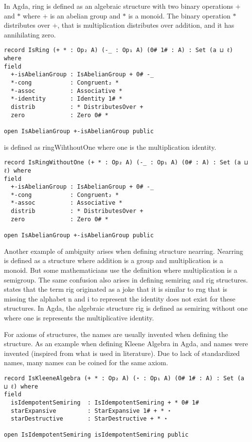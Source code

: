 In Agda, ring is defined as an algebraic structure with two binary operations $+$
and $*$ where $+$ is an abelian group and $*$ is a monoid. The binary operation $*$
distributes over $+$, that is multiplication distributes over addition, and it has
annihilating zero.

\begin{verbatim}
record IsRing (+ * : Op₂ A) (-_ : Op₁ A) (0# 1# : A) : Set (a ⊔ ℓ) where
field
  +-isAbelianGroup : IsAbelianGroup + 0# -_
  *-cong           : Congruent₂ *
  *-assoc          : Associative *
  *-identity       : Identity 1# *
  distrib          : * DistributesOver +
  zero             : Zero 0# *

open IsAbelianGroup +-isAbelianGroup public
\end{verbatim} 
 is defined as ringWihthoutOne where one is the multiplication identity.
\begin{verbatim}
record IsRingWithoutOne (+ * : Op₂ A) (-_ : Op₁ A) (0# : A) : Set (a ⊔ ℓ) where
field
  +-isAbelianGroup : IsAbelianGroup + 0# -_
  *-cong           : Congruent₂ *
  *-assoc          : Associative *
  distrib          : * DistributesOver +
  zero             : Zero 0# *

open IsAbelianGroup +-isAbelianGroup public
\end{verbatim}

Another example of ambiguity arises when defining structure nearring. Nearring
is defined as a structure where addition is a group and multiplication is a
monoid. But some mathematicians use the definition where multiplication is a
semigroup. The same confusion also arises in defining semiring and rig
structures. \cite{enwiki:1133737666} states that the term rig originated as a
joke that it is similar to rng that is missing the alphabet n and i to represent
the identity does not exist for these structures. In Agda, the algebraic
structure rig is defined as semiring without one where one is represents the
multiplicative identity.

For axioms of structures, the names are usually invented when defining the
structure. As an example when defining Kleene Algebra in Agda,
 and  names were invented
(inspired from what is used in literature). Due to lack of standardized names,
many names can be coined for the same axiom.

\begin{verbatim}
record IsKleeneAlgebra (+ * : Op₂ A) (⋆ : Op₁ A) (0# 1# : A) : Set (a ⊔ ℓ) where
field
  isIdempotentSemiring  : IsIdempotentSemiring + * 0# 1#
  starExpansive         : StarExpansive 1# + * ⋆
  starDestructive       : StarDestructive + * ⋆

open IsIdempotentSemiring isIdempotentSemiring public
\end{verbatim} 


